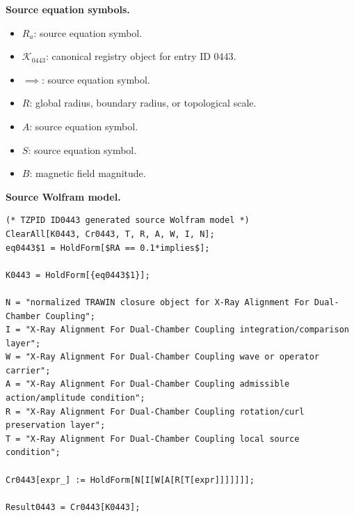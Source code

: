 \begin{minipage}[t]{0.49\linewidth}
\begingroup
\small
\raggedright
\textbf{Source equation symbols.}\par
\begin{itemize}[leftmargin=1.35em,itemsep=1pt,topsep=1pt,parsep=0pt]
    \item $R_a$: source equation symbol.
    \item $\mathcal{K}_{0443}$: canonical registry object for entry ID 0443.
    \item $\implies$: source equation symbol.
    \item $R$: global radius, boundary radius, or topological scale.
    \item $A$: source equation symbol.
    \item $S$: source equation symbol.
    \item $B$: magnetic field magnitude.
\end{itemize}
\endgroup
\end{minipage}\hfill
\begin{minipage}[t]{0.47\linewidth}
\begingroup
\scriptsize
\raggedright
\textbf{Source Wolfram model.}\par
\begin{Verbatim}[fontsize=\tiny,breaklines=true,breakanywhere=true]
(* TZPID ID0443 generated source Wolfram model *)
ClearAll[K0443, Cr0443, T, R, A, W, I, N];
eq0443$1 = HoldForm[$RA == 0.1*implies$];

K0443 = HoldForm[{eq0443$1}];

N = "normalized TRAWIN closure object for X-Ray Alignment For Dual-Chamber Coupling";
I = "X-Ray Alignment For Dual-Chamber Coupling integration/comparison layer";
W = "X-Ray Alignment For Dual-Chamber Coupling wave or operator carrier";
A = "X-Ray Alignment For Dual-Chamber Coupling admissible action/amplitude condition";
R = "X-Ray Alignment For Dual-Chamber Coupling rotation/curl preservation layer";
T = "X-Ray Alignment For Dual-Chamber Coupling local source condition";

Cr0443[expr_] := HoldForm[N[I[W[A[R[T[expr]]]]]]];

Result0443 = Cr0443[K0443];
\end{Verbatim}
\endgroup
\end{minipage}

